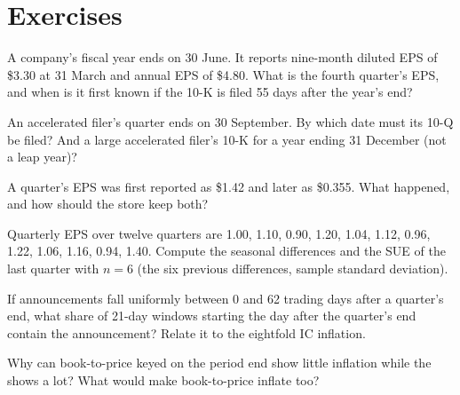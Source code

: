 \section{Exercises}

\begin{exercise}[$\star$]\label{exo:rs:fundamental-analyst-and-event-features:1}
A company's fiscal year ends on 30 June. It reports nine-month diluted EPS of \$3.30 at 31 March and annual EPS of \$4.80. What is the fourth
quarter's EPS, and when is it first known if the 10-K is filed 55 days after the year's end?
\end{exercise}

\begin{exercise}[$\star$]\label{exo:rs:fundamental-analyst-and-event-features:2}
An accelerated filer's quarter ends on 30 September. By which date must its 10-Q be filed? And a large accelerated filer's 10-K for a year
ending 31 December (not a leap year)?
\end{exercise}

\begin{exercise}[$\star$]\label{exo:rs:fundamental-analyst-and-event-features:3}
A quarter's EPS was first reported as \$1.42 and later as \$0.355. What happened, and how should the store keep both?
\end{exercise}

\begin{exercise}[$\star\star$]\label{exo:rs:fundamental-analyst-and-event-features:4}
Quarterly EPS over twelve quarters are 1.00, 1.10, 0.90, 1.20, 1.04, 1.12, 0.96, 1.22, 1.06, 1.16, 0.94, 1.40. Compute the seasonal differences and the SUE of the last quarter with $n = 6$ (the six previous differences, sample standard deviation).
\end{exercise}

\begin{exercise}[$\star\star$]\label{exo:rs:fundamental-analyst-and-event-features:5}
If announcements fall uniformly between 0 and 62 trading days after a quarter's end, what share of 21-day windows starting the day after the
quarter's end contain the announcement? Relate it to the eightfold IC inflation.
\end{exercise}

\begin{exercise}[$\star\star$]\label{exo:rs:fundamental-analyst-and-event-features:6}
Why can book-to-price keyed on the period end show little inflation while the  shows a lot? What would make book-to-price
inflate too?
\end{exercise}


